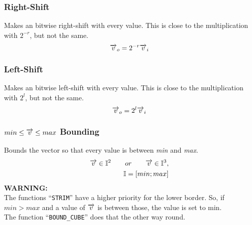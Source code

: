 \subsubsection*{Right-Shift}
Makes an bitwise right-shift with every value. This is close to the multiplication with $ 2^{-r} $, but not the same.
\begin{equation}
\overrightarrow{v}_o = 2^{-r} \overrightarrow{v}_i
\end{equation}

\subsubsection*{Left-Shift}
Makes an bitwise left-shift with every value. This is close to the multiplication with $ 2^{l} $, but not the same.
\begin{equation}
\overrightarrow{v}_o = 2^{l} \overrightarrow{v}_i
\end{equation}

\subsubsection*{$min \leq \overrightarrow{v} \leq max$ Bounding}
Bounds the vector so that every value is between \textit{min} and \textit{max}.
\begin{eqnarray}
\overrightarrow{v} \in \mathbb{I}^2 \qquad or \qquad \overrightarrow{v} \in \mathbb{I}^3, \\
\mathbb{I} = [min; max]
\end{eqnarray}
\textbf{WARNING:}\\
The functions ``\texttt{STRIM}'' have a higher priority for the lower border. So, if $ min > max$ and a value of $ \overrightarrow{v} $ is between those, the value is set to min. \\
The function ``\texttt{BOUND\_CUBE}'' does that the other way round.\\

